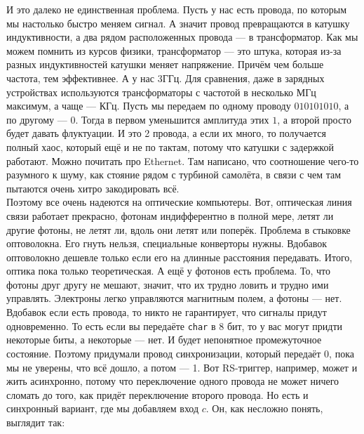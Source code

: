 \documentclass{article}
\begin{document}
    И это далеко не единственная проблема. Пусть у нас есть провода, по которым мы настолько быстро меняем сигнал. А значит провод превращаются в катушку индуктивности, а два рядом расположенных провода --- в трансформатор. Как мы можем помнить из курсов физики, трансформатор --- это штука, которая из-за разных индуктивностей катушки меняет напряжение. Причём чем больше частота, тем эффективнее. А у нас 3ГГц. Для сравнения, даже в зарядных устройствах используются трансформаторы с частотой в несколько МГц максимум, а чаще --- КГц. Пусть мы передаем по одному проводу $010101010$, а по другому --- $0$. Тогда в первом уменьшится амплитуда этих $1$, а второй просто будет давать флуктуации. И это 2 провода, а если их много, то получается полный хаос, который ещё и не по тактам, потому что катушки с задержкой работают. Можно почитать про Ethernet. Там написано, что соотношение чего-то разумного к шуму, как стояние рядом с турбиной самолёта, в связи с чем там пытаются очень хитро закодировать всё.\\
    Поэтому все очень надеются на оптические компьютеры. Вот, оптическая линия связи работает прекрасно, фотонам индифферентно в полной мере, летят ли другие фотоны, не летят ли, вдоль они летят или поперёк. Проблема в стыковке оптоволокна. Его гнуть нельзя, специальные конверторы нужны. Вдобавок оптоволокно дешевле только если его на длинные расстояния передавать. Итого, оптика пока только теоретическая. А ещё у фотонов есть проблема. То, что фотоны друг другу не мешают, значит, что их трудно ловить и трудно ими управлять. Электроны легко управляются магнитным полем, а фотоны --- нет.\\
    Вдобавок если есть провода, то никто не гарантирует, что сигналы придут одновременно. То есть если вы передаёте \texttt{char} в 8 бит, то у вас могут придти некоторые биты, а некоторые --- нет. И будет непонятное промежуточное состояние. Поэтому придумали провод синхронизации, который передаёт 0, пока мы не уверены, что всё дошло, а потом --- 1. Вот RS-триггер, например, может и жить асинхронно, потому что переключение одного провода не может ничего сломать до того, как придёт переключение второго провода. Но есть и синхронный вариант, где мы добавляем вход $c$. Он, как несложно понять, выглядит так:
\end{document}
